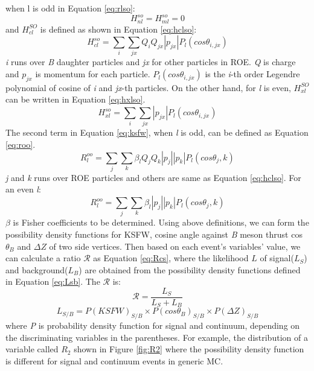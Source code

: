 when l is odd in Equation \ref{eq:rlso}: 
\begin{equation}
	H_{nl}^{so}=H_{ml}^{so}=0
\end{equation}
and $H_{cl}^{SO}$ is defined as shown in Equation \ref{eq:hclso}: 
\begin{equation}\label{eq:hclso}
	H_{cl}^{so} = \sum_i \sum_{jx}Q_i Q_{jx}|p_{jx}|P_l(cos\theta_{i,jx})
\end{equation}
\textit{i} runs over \textit{B} daughter particles and \textit{jx} for other particles in ROE. \textit{Q} is charge and $p_{jx}$ is momentum for each particle. $P_l(cos\theta_{i,jx})$ is the \textit{i}-th order Legendre polynomial of cosine of \textit{i} and \textit{jx}-th particles.
On the other hand, for \textit{l} is even, $H_{xl}^{SO}$ can be written in Equation \ref{eq:hxlso}.
\begin{equation}\label{eq:hxlso}
	H_{xl}^{so}=\sum_i \sum_{jx}|p_{jx}|P_l(cos\theta_{i,jx})
\end{equation}
The second term in Equation \ref{eq:ksfw}, when \textit{l} is odd, can be defined as Equation \ref{eq:roo}.
\begin{equation}\label{eq:roo}
	R^{oo}_l = \sum_j \sum_k \beta_l Q_j Q_k |p_j||p_k|P_l(cos\theta_j,k)
\end{equation}
\textit{j} and \textit{k} runs over ROE particles and others are same as Equation \ref{eq:hclso}.
For an even \textit{l}: 
\begin{equation}
	R^{oo}_l = \sum_j \sum_k \beta_l |p_j||p_k|P_l(cos\theta_j,k)
\end{equation}
$\beta$ is Fisher coefficients to be determined. 
Using above definitions, we can form the possibility density functions for KSFW, cosine angle against \textit{B} meson thrust cos$\theta_B$ and $\Delta Z$ of two side vertices.  Then based on each event's variables' value, we can calculate a ratio $\mathcal{R}$ as Equation \ref{eq:Rcs}, where the likelihood $L$ of signal($L_S$) and background($L_B$) are obtained from the possibility density functions defined in Equation \ref{eq:Lsb}.
The $ \mathcal{R} $ is: 
\begin{equation}\label{eq:Rcs}
	\mathcal{R} = \frac{L_S}{L_S+L_B}
\end{equation}
\begin{equation}\label{eq:Lsb}
L_{S/B} = P(KSFW)_{S/B} \times P(cos\theta_B)_{S/B} \times P(\Delta Z)_{S/B}
\end{equation}
where \textit{P} is probability density function for signal and continuum, depending on the discriminating variables in the parentheses. For example, the distribution of a variable called $R_2$ shown in Figure \ref{fig:R2} where the possibility density function is different for signal and continuum events in generic MC.

